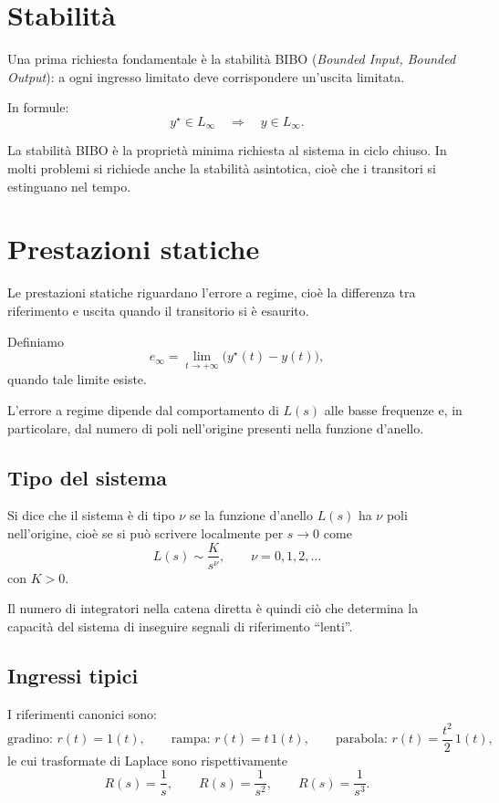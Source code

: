 \section{Stabilità}

Una prima richiesta fondamentale è la stabilità BIBO
(\emph{Bounded Input, Bounded Output}):
a ogni ingresso limitato deve corrispondere un'uscita limitata.

In formule:
\[
y^\star \in L_\infty \quad \Longrightarrow \quad y \in L_\infty.
\]

La stabilità BIBO è la proprietà minima richiesta al sistema in ciclo chiuso.
In molti problemi si richiede anche la stabilità asintotica, cioè che i transitori
si estinguano nel tempo.

\section{Prestazioni statiche}

Le prestazioni statiche riguardano l'errore a regime, cioè la differenza tra
riferimento e uscita quando il transitorio si è esaurito.

Definiamo
\[
e_\infty=\lim_{t\to+\infty}\bigl(y^\star(t)-y(t)\bigr),
\]
quando tale limite esiste.

L'errore a regime dipende dal comportamento di \(L(s)\) alle basse frequenze
e, in particolare, dal numero di poli nell'origine presenti nella funzione d'anello.

\subsection{Tipo del sistema}

Si dice che il sistema è di tipo \(\nu\) se la funzione d'anello \(L(s)\)
ha \(\nu\) poli nell'origine, cioè se si può scrivere localmente per \(s\to 0\) come
\[
L(s)\sim \frac{K}{s^\nu},
\qquad \nu=0,1,2,\dots
\]
con \(K>0\).

Il numero di integratori nella catena diretta è quindi ciò che determina
la capacità del sistema di inseguire segnali di riferimento ``lenti''.

\subsection{Ingressi tipici}

I riferimenti canonici sono:
\[
\text{gradino: } r(t)=1(t),
\qquad
\text{rampa: } r(t)=t\,1(t),
\qquad
\text{parabola: } r(t)=\frac{t^2}{2}\,1(t),
\]
le cui trasformate di Laplace sono rispettivamente
\[
R(s)=\frac{1}{s},
\qquad
R(s)=\frac{1}{s^2},
\qquad
R(s)=\frac{1}{s^3}.
\]


